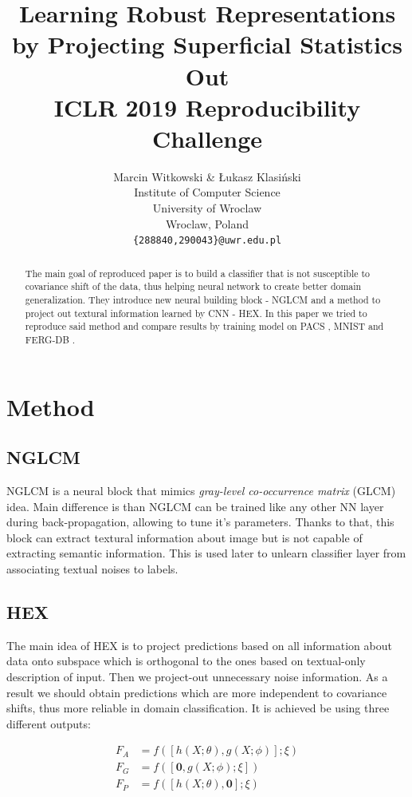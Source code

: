 \documentclass{article} %
\title{Learning Robust Representations by Projecting Superficial Statistics Out \\ ICLR 2019 Reproducibility Challenge}
\author{Marcin Witkowski \& Łukasz Klasiński \\
Institute of Computer Science \\
University of Wroclaw \\
Wroclaw, Poland \\
\texttt{\{288840,290043\}@uwr.edu.pl} \\
}
\begin{document}
\maketitle

\begin{abstract}
The main goal of reproduced paper is to build a classifier that is not susceptible to covariance shift
of the data, thus helping neural network to create better domain generalization. They introduce new neural building
block - NGLCM and a method to project out textural information learned by CNN - HEX. In this
paper we tried to reproduce said method and compare results by training model on PACS \citep{Li2017dg}, MNIST and FERG-DB \citep{aneja2016modeling}.

\end{abstract}

\section{Method}

\subsection{NGLCM}

NGLCM is a neural block that mimics \textit{gray-level co-occurrence matrix} (GLCM) \citep{glcm}
idea. Main difference is than NGLCM can be trained like any other NN layer during back-propagation, allowing
to tune it's parameters. Thanks to that, this block can extract textural 
information about image but is not capable of extracting semantic information. This is used later to 
unlearn classifier layer from associating textual noises to labels. 

\subsection{HEX}

The main idea of HEX is to project predictions based on all information about data onto subspace which is orthogonal to the ones based on textual-only description of input.
Then we project-out unnecessary noise information. As a result we should obtain predictions which are more independent to covariance shifts, thus more reliable
in domain classification. It is achieved be using three different outputs:

\begin{align*}
F_A & = f([h(X;\theta), g(X;\phi)];\xi) \\
F_G & = f([\mathbf{0}, g(X;\phi);\xi]) \\
F_P & = f([h(X;\theta), \mathbf{0}];\xi)
\end{align*}
\end{document}
